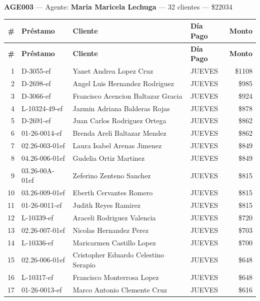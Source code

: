 \documentclass[11pt,a4paper]{article}
\newcommand{\money}[1]{\$\num{#1}}
\begin{document}
\noindent\textbf{AGE003} --- Agente: \textbf{Maria Maricela Lechuga} --- 32 clientes --- \money{22034}


\begin{center}
\renewcommand{\arraystretch}{1.1}
\footnotesize
\begin{longtable}{rlp{6.5cm}lr}
\toprule
\textbf{\#} & \textbf{Pr\'estamo} & \textbf{Cliente} & \textbf{D\'ia Pago} & \textbf{Monto} \\
\midrule
\endfirsthead
\toprule
\textbf{\#} & \textbf{Pr\'estamo} & \textbf{Cliente} & \textbf{D\'ia Pago} & \textbf{Monto} \\
\midrule
\endhead
1 & D-3055-ef & Yanet Andrea Lopez Cruz & JUEVES & \money{1108} \\
2 & D-2698-ef & Angel Luis Hernandez Rodriguez & JUEVES & \money{985} \\
3 & D-3066-ef & Francisco Acencion Baltazar Gracia & JUEVES & \money{924} \\
4 & L-10324-49-ef & Jazmin Adriana Balderas Rojas & JUEVES & \money{878} \\
5 & D-2691-ef & Juan Carlos Rodriguez Ortega & JUEVES & \money{862} \\
6 & 01-26-0014-ef & Brenda Areli Baltazar Mendez & JUEVES & \money{862} \\
7 & 02.26-003-01ef & Laura Isabel Arenas Jimenez & JUEVES & \money{849} \\
8 & 04.26-006-01ef & Gudelia Ortiz Martinez & JUEVES & \money{849} \\
9 & 03.26-00A-01ef & Zeferino Zenteno Sanchez & JUEVES & \money{815} \\
10 & 03.26-009-01ef & Eberth Cervantes Romero & JUEVES & \money{815} \\
11 & 01-26-0011-ef & Judith Reyes Ramirez & JUEVES & \money{815} \\
12 & L-10339-ef & Araceli Rodriguez Valencia & JUEVES & \money{720} \\
13 & 02.26-007-01ef & Nicolas Hernandez Perez & JUEVES & \money{703} \\
14 & L-10336-ef & Maricarmen Castillo Lopez & JUEVES & \money{700} \\
15 & 02.26-006-01ef & Cristopher Eduardo Celestino Serapio & JUEVES & \money{648} \\
16 & L-10317-ef & Francisco Monterrosa Lopez & JUEVES & \money{648} \\
17 & 01-26-0013-ef & Marco Antonio Clemente Cruz & JUEVES & \money{616} \\

\end{longtable}
\end{center}
\end{document}
